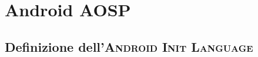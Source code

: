 \appendix
\chapter{Android AOSP}
\minitoc\mtcskip
\section{Definizione dell'\textsc{Android Init Language}}\label{sec:appxINIT}


